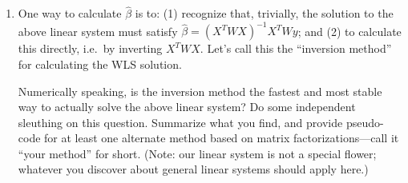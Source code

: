\documentclass{article}
\begin{document}
\begin{enumerate}[label=(\Alph*)]
{}






\item One way to calculate $\hat{\beta}$ is to: (1) recognize that, trivially, the solution to the above linear system must satisfy $\hat \beta = (X^T W X)^{-1} X^T W y$; and (2) to calculate this directly, i.e.~by inverting $X^T W X$.  Let's call this the ``inversion method'' for calculating the WLS solution.


Numerically speaking, is the inversion method the fastest and most stable way to actually solve the above linear system?  Do some independent sleuthing on this question.  Summarize what you find, and provide pseudo-code for at least one alternate method based on matrix factorizations---call it ``your method'' for short.  (Note: our linear system is not a special flower; whatever you discover about general linear systems should apply here.)


\end{enumerate}
\end{document}
